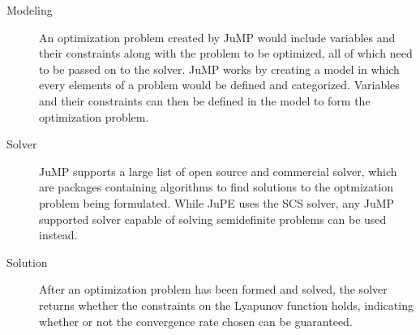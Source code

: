 \begin{description}
	\item[Modeling] An optimization problem created by JuMP would include variables and their constraints along with the problem to be optimized, all of which need to be passed on to the solver. JuMP works by creating a model in which every elements of a problem would be defined and categorized. Variables and their constraints can then be defined in the model to form the optimization problem.
	\item[Solver] JuMP supports a large list of open source and commercial solver, which are packages containing algorithms to find solutions to the optmization problem being formulated. While JuPE uses the SCS \cite{SCS} solver, any JuMP supported solver capable of solving semidefinite problems can be used instead.
	\item[Solution] After an optimization problem has been formed and solved, the solver returns whether the constraints on the Lyapunov function holds, indicating whether or not the convergence rate chosen can be guaranteed. 	 
\end{description}

